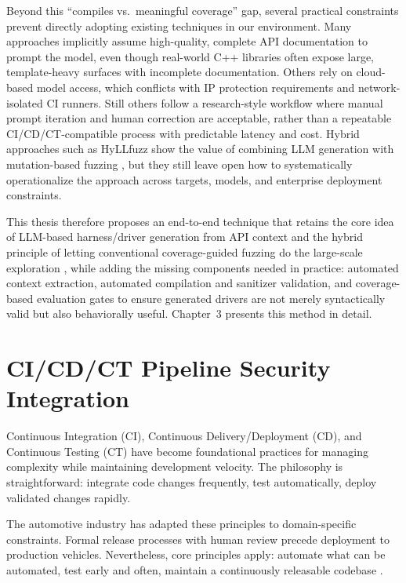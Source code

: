Beyond this ``compiles vs.\ meaningful coverage'' gap, several practical constraints prevent directly adopting existing techniques in our environment. Many approaches implicitly assume high-quality, complete API documentation to prompt the model, even though real-world C++ libraries often expose large, template-heavy surfaces with incomplete documentation. Others rely on cloud-based model access, which conflicts with IP protection requirements and network-isolated CI runners. Still others follow a research-style workflow where manual prompt iteration and human correction are acceptable, rather than a repeatable CI/CD/CT-compatible process with predictable latency and cost. Hybrid approaches such as HyLLfuzz show the value of combining LLM generation with mutation-based fuzzing \cite{HyLLfuzz2024}, but they still leave open how to systematically operationalize the approach across targets, models, and enterprise deployment constraints.

This thesis therefore proposes an end-to-end technique that retains the core idea of LLM-based harness/driver generation from API context \cite{TitanFuzz2022, Fuzz4All2023} and the hybrid principle of letting conventional coverage-guided fuzzing do the large-scale exploration \cite{HyLLfuzz2024}, while adding the missing components needed in practice: automated context extraction, automated compilation and sanitizer validation, and coverage-based evaluation gates to ensure generated drivers are not merely syntactically valid but also behaviorally useful. Chapter~3 presents this method in detail.

\section{CI/CD/CT Pipeline Security Integration}
\label{sec:lit_cicd_integration}

Continuous Integration (CI), Continuous Delivery/Deployment (CD), and Continuous Testing (CT) have become foundational practices for managing complexity while maintaining development velocity. The philosophy is straightforward: integrate code changes frequently, test automatically, deploy validated changes rapidly.

The automotive industry has adapted these principles to domain-specific constraints. Formal release processes with human review precede deployment to production vehicles. Nevertheless, core principles apply: automate what can be automated, test early and often, maintain a continuously releasable codebase \cite{CiCdFuzzing2022}.

